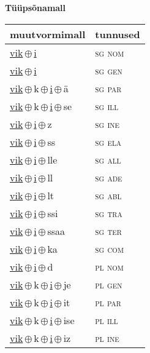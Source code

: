 

\vspace{3.5em}
\noindent \begin{minipage}{\textwidth}
\noindent \textbf{Tüüpsõnamall \,}\\

\begin{sideways}
\begin{tabular}{l l}
muutvormimall & tunnused \\
\hline
\underline{vik}\,$\oplus$\,\underline{i} & \textsc{ sg nom } \\
\underline{vik}\,$\oplus$\,\underline{i} & \textsc{ sg gen } \\
\underline{vik}\,$\oplus$\,k\,$\oplus$\,\underline{i}\,$\oplus$\,ä & \textsc{ sg par } \\
\underline{vik}\,$\oplus$\,k\,$\oplus$\,\underline{i}\,$\oplus$\,se & \textsc{ sg ill } \\
\underline{vik}\,$\oplus$\,\underline{i}\,$\oplus$\,z & \textsc{ sg ine } \\
\underline{vik}\,$\oplus$\,\underline{i}\,$\oplus$\,ss & \textsc{ sg ela } \\
\underline{vik}\,$\oplus$\,\underline{i}\,$\oplus$\,lle & \textsc{ sg all } \\
\underline{vik}\,$\oplus$\,\underline{i}\,$\oplus$\,ll & \textsc{ sg ade } \\
\underline{vik}\,$\oplus$\,\underline{i}\,$\oplus$\,lt & \textsc{ sg abl } \\
\underline{vik}\,$\oplus$\,\underline{i}\,$\oplus$\,ssi & \textsc{ sg tra } \\
\underline{vik}\,$\oplus$\,\underline{i}\,$\oplus$\,ssaa & \textsc{ sg ter } \\
\underline{vik}\,$\oplus$\,\underline{i}\,$\oplus$\,ka & \textsc{ sg com } \\
\underline{vik}\,$\oplus$\,\underline{i}\,$\oplus$\,d & \textsc{ pl nom } \\
\underline{vik}\,$\oplus$\,k\,$\oplus$\,\underline{i}\,$\oplus$\,je & \textsc{ pl gen } \\
\underline{vik}\,$\oplus$\,k\,$\oplus$\,\underline{i}\,$\oplus$\,it & \textsc{ pl par } \\
\underline{vik}\,$\oplus$\,k\,$\oplus$\,\underline{i}\,$\oplus$\,ise & \textsc{ pl ill } \\
\underline{vik}\,$\oplus$\,k\,$\oplus$\,\underline{i}\,$\oplus$\,iz & \textsc{ pl ine } \\

\end{tabular}
\end{sideways}
\end{minipage}
